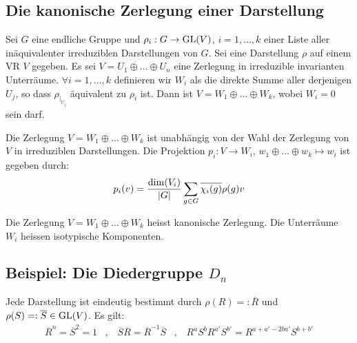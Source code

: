 \subsection{Die kanonische Zerlegung einer Darstellung}

\begin{satz}
    Sei $G$ eine endliche Gruppe und $\rho_i : G \rightarrow \text{GL}(V)$,
    $i=1,\dots,k$ einer Liste aller inäquivalenter irreduziblen
    Darstellungen von $G$. Sei eine Darstellung $\rho$ auf einem VR $V$
    gegeben. Es sei $V = U_1 \oplus \dots \oplus U_n$ eine Zerlegung in
    irreduzible invarianten Unterräume. $\forall i = 1,\dots,k$ definieren
    wir $W_i$ als die direkte Summe aller derjenigen $U_j$, so dass
    $\rho_{|_{U_j}}$ äquivalent zu $\rho_i$ ist. Dann ist
    $V = W_1 \oplus \dots \oplus W_k$, wobei $W_i = 0$ sein darf.
\end{satz}

\begin{satz}
    Die Zerlegung $V = W_1 \oplus \dots \oplus W_k$ ist unabhängig von der
    Wahl der Zerlegung von $V$ in irreduziblen Darstellungen. Die Projektion
    $p_i : V \rightarrow W_i$, $w_1 \oplus \dots \oplus w_k \mapsto w_i$ ist
    gegeben durch:
    \begin{align*}
        p_i(v) = \frac{\dim (V_i)}{\left\vert G \right\vert} \sum_{g \in G} \overline{\chi_i(g)} \rho(g) v
    \end{align*}
\end{satz}

\begin{bemerkung}
    Die Zerlegung $V = W_1 \oplus \dots \oplus W_k$ heisst kanonische
    Zerlegung. Die Unterräume $W_i$ heissen isotypische Komponenten.
\end{bemerkung}

\subsection{Beispiel: Die Diedergruppe $D_n$}

Jede Darstellung ist eindeutig bestimmt durch $\rho(R) =: \overline{R}$
und $\rho(S) =: \overline{S} \in \text{GL}(V)$. Es gilt:
\begin{align*}
    \overline{R}^n = \overline{S}^2 = 1
    \hspace{10pt} , \hspace{10pt}
    \overline{S} \overline{R} = \overline{R}^{-1} \overline{S}
    \hspace{10pt} , \hspace{10pt}
    R^a S^b R^{a'} S^{b'} = R^{a + a' - 2 b a'} S^{b + b'}
\end{align*}

